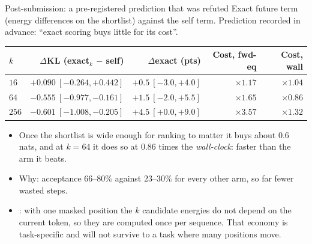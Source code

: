 \documentclass{beamer}
\begin{document}
\begin{frame}[noframenumbering]{Post-submission: a pre-registered prediction that was refuted}
  \small
  Exact future term (energy differences on the shortlist) against the self term. Prediction
  recorded in advance: ``exact scoring buys little for its cost''. 
  \begin{center}
  \scriptsize
  \begin{tabular}{lrrrr}
    \toprule
    $k$ & $\Delta$KL (exact$_k$ $-$ self) & $\Delta$exact (pts) & Cost, fwd-eq & Cost, wall \\
    \midrule
    $16$  & $+0.090\ [-0.264,+0.442]$ & $+0.5\ [-3.0,+4.0]$ & $\times 1.17$ & $\times 1.04$ \\
    $64$  & $\bm{-0.555\ [-0.977,-0.161]}$ & $+1.5\ [-2.0,+5.5]$ & $\times 1.65$ & $\bm{\times 0.86}$ \\
    $256$ & $\bm{-0.601\ [-1.008,-0.205]}$ & $\bm{+4.5\ [+0.0,+9.0]}$ & $\times 3.57$ & $\times 1.32$ \\
    \bottomrule
  \end{tabular}
  \end{center}
  \vspace{0.3em}
  \begin{itemize}\small
    \item Once the shortlist is wide enough for ranking to matter it buys about $0.6$ nats, and
      at $k=64$ it does so at $0.86$ times the \emph{wall-clock}: faster than the arm it beats.
    \item Why: acceptance $66$--$80\%$ against $23$--$30\%$ for every other arm, so far fewer
      wasted steps.
    \item {}: with one masked position the $k$ candidate
      energies do not depend on the current token, so they are computed once per sequence. That
      economy is task-specific and will not survive to a task where many positions move.
  \end{itemize}
\end{frame}
\end{document}
